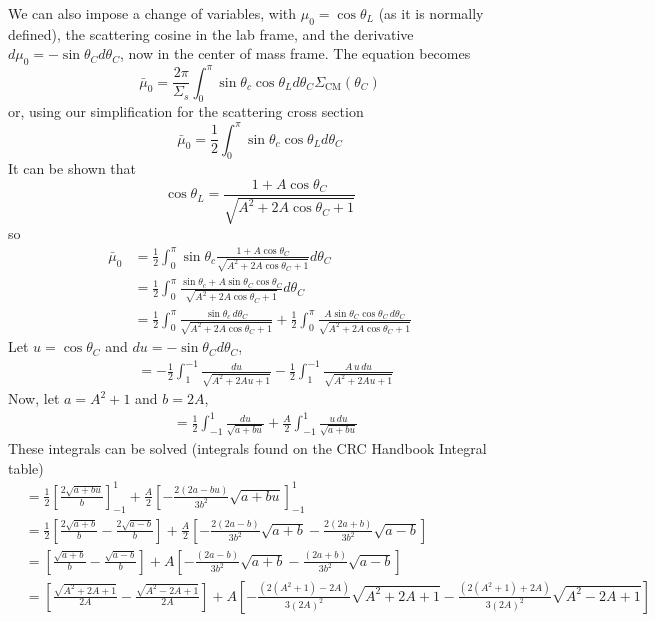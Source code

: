 \documentclass{article}
\begin{document}
We can also impose a change of variables, with $\mu_0 = \cos\theta_L$ (as it is normally defined), the scattering cosine in the lab frame, and the derivative $d\mu_0 = -\sin\theta_C d\theta_C$, now in the center of mass frame. The equation becomes
$$ \bar{\mu}_0 = \frac{2\pi}{\Sigma_s}\int_{0}^{\pi} \sin\theta_c \cos\theta_L d\theta_C \Sigma_{\text{CM}}(\theta_C) $$
or, using our simplification for the scattering cross section
$$ \bar{\mu}_0 = \frac{1}{2}\int_{0}^{\pi} \sin\theta_c \cos\theta_L d\theta_C $$
It can be shown that
$$ \cos\theta_L = \frac{1+A\cos\theta_C}{\sqrt{A^2+2A\cos\theta_C+1}} $$
so
\begin{align*}
\bar{\mu}_0	&= \frac{1}{2}\int_{0}^{\pi} \sin\theta_c \frac{1+A\cos\theta_C}{\sqrt{A^2+2A\cos\theta_C+1}} d\theta_C \\
			&= \frac{1}{2}\int_{0}^{\pi} \frac{\sin\theta_c+A\sin\theta_C\cos\theta_C}{\sqrt{A^2+2A\cos\theta_C+1}} d\theta_C \\
			&= \frac{1}{2}\int_{0}^{\pi} \frac{\sin\theta_c \,d\theta_C}{\sqrt{A^2+2A\cos\theta_C+1}} + \frac{1}{2}\int_{0}^{\pi}\frac{A\sin\theta_C\cos\theta_C \,d\theta_C}{\sqrt{A^2+2A\cos\theta_C+1}}  
\end{align*}
Let $u = \cos\theta_C$ and $du = -\sin\theta_C d\theta_C$,
\begin{align*}
			&= -\frac{1}{2}\int_{1}^{-1} \frac{du}{\sqrt{A^2+2Au+1}} - \frac{1}{2}\int_{1}^{-1}\frac{A \, u \, du}{\sqrt{A^2+2Au+1}} 
\end{align*}
Now, let $a = A^2+1$ and $b = 2A$,
\begin{align*}
			&= \frac{1}{2}\int_{-1}^{1} \frac{du}{\sqrt{a+bu}} + \frac{A}{2}\int_{-1}^{1}\frac{u \, du}{\sqrt{a+bu}} 
\end{align*}
These integrals can be solved (integrals found on the CRC Handbook Integral table)
\begin{align*}
			&= \frac{1}{2}\left[ \frac{2\sqrt{a+bu}}{b} \right]_{-1}^{1} + \frac{A}{2}\left[ -\frac{2(2a-bu)}{3b^2}\sqrt{a+bu} \right]_{-1}^{1} \\
			&= \frac{1}{2}\left[ \frac{2\sqrt{a+b}}{b} - \frac{2\sqrt{a-b}}{b}\right] + \frac{A}{2}\left[ -\frac{2(2a-b)}{3b^2}\sqrt{a+b} - \frac{2(2a+b)}{3b^2}\sqrt{a-b} \right] \\
			&= \left[ \frac{\sqrt{a+b}}{b} - \frac{\sqrt{a-b}}{b}\right] + A\left[ -\frac{(2a-b)}{3b^2}\sqrt{a+b} - \frac{(2a+b)}{3b^2}\sqrt{a-b} \right] \\ 
			&= \left[ \frac{\sqrt{A^2+2A+1}}{2A} - \frac{\sqrt{A^2-2A+1}}{2A}\right] + A\left[ -\frac{(2(A^2+1)-2A)}{3(2A)^2}\sqrt{A^2+2A+1} - \frac{(2(A^2+1)+2A)}{3(2A)^2}\sqrt{A^2-2A+1} \right] 
\end{align*}
\end{document}
